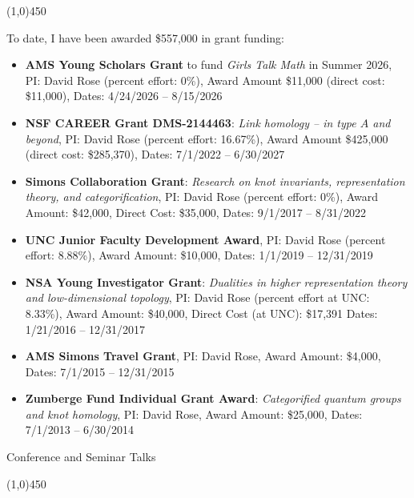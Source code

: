 \documentclass[10pt]{article}
\begin{document}
\vspace{-0.1in}
\noindent
\line(1,0){450}

\smallskip

\noindent To date, I have been awarded \$557,000 in grant funding:

\begin{itemize}
\item {\bf AMS Young Scholars Grant} to fund 
\emph{Girls Talk Math} in Summer 2026,
PI: David Rose (percent effort: 0\%),
Award Amount \$11,000 (direct cost: \$11,000),
Dates: 4/24/2026 -- 8/15/2026

\item {\bf NSF CAREER Grant DMS-2144463}: 
\emph{Link homology -- in type $A$ and beyond},
PI: David Rose (percent effort: 16.67\%),
Award Amount \$425,000 (direct cost: \$285,370),
Dates: 7/1/2022 -- 6/30/2027

\item {\bf Simons Collaboration Grant}: 
\emph{Research on knot invariants, representation theory, and categorification}, 
PI: David Rose (percent effort: 0\%), 
Award Amount: \$42,000, 
Direct Cost: \$35,000,
Dates: 9/1/2017 -- 8/31/2022

\item {\bf UNC Junior Faculty Development Award},
PI: David Rose (percent effort: 8.88\%), 
Award Amount: \$10,000, 
Dates: 1/1/2019 -- 12/31/2019

\item {\bf NSA Young Investigator Grant}: 
\emph{ Dualities in higher representation theory and low-dimensional topology}, 
PI: David Rose (percent effort at UNC: 8.33\%), 
Award Amount: \$40,000, 
Direct Cost (at UNC): \$17,391
Dates: 1/21/2016 -- 12/31/2017

\item {\bf AMS Simons Travel Grant}, 
PI: David Rose,
Award Amount: \$4,000, 
Dates: 7/1/2015 -- 12/31/2015

 \item {\bf Zumberge Fund Individual Grant Award}: \emph{ Categorified quantum groups and knot homology}, 
 PI: David Rose,
 Award Amount: \$25,000, 
 Dates: 7/1/2013 -- 6/30/2014
\end{itemize}


\bigskip
\noindent
{\large \sc Conference and Seminar Talks}

\vspace{-0.1in}
\noindent
\line(1,0){450}
\smallskip
\end{document}
